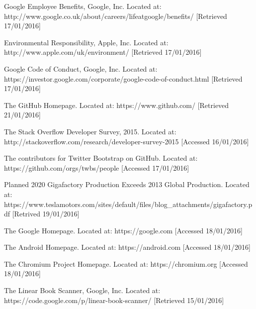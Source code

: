 \begin{thebibliography}{100}
 Google Employee Benefits,
  Google, Inc.
  Located at: http://www.google.co.uk/about/careers/lifeatgoogle/benefits/ [Retrieved 17/01/2016]

 Environmental Responsibility,
  Apple, Inc.
  Located at: http://www.apple.com/uk/environment/ [Retrieved 17/01/2016]

 Google Code of Conduct,
  Google, Inc.
  Located at: https://investor.google.com/corporate/google-code-of-conduct.html [Retrieved 17/01/2016]

 The GitHub Homepage.
  Located at: https://www.github.com/  [Retrieved 21/01/2016]

 The Stack Overflow Developer Survey,
    2015.
	Located at: http://stackoverflow.com/research/developer-survey-2015 [Accessed 16/01/2016]

 The contributors for Twitter Bootstrap on GitHub.
	Located at: https://github.com/orgs/twbs/people [Accessed 17/01/2016]

 Planned 2020 Gigafactory Production Exceeds 2013 Global Production.
	Located at: https://www.teslamotors.com/sites/default/files/blog\_attachments/gigafactory.pdf [Retrived 19/01/2016]

 The Google Homepage.
    Located at: https://google.com [Accessed 18/01/2016]

 The Android Homepage.
    Located at: https://android.com [Accessed 18/01/2016]

 The Chromium Project Homepage.
    Located at: https://chromium.org [Accessed 18/01/2016]

 The Linear Book Scanner,
  Google, Inc.
  Located at: https://code.google.com/p/linear-book-scanner/ [Retrieved 15/01/2016]


\end{thebibliography}

\newpage{\pagestyle{empty}\cleardoublepage}